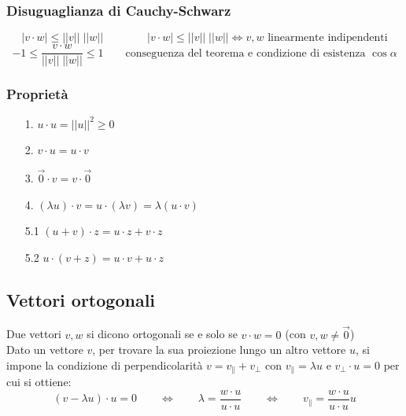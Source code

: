 \documentclass[a4paper]{article}
\begin{document}
\subsubsection*{Disuguaglianza di Cauchy-Schwarz}
\[|v \cdot w| \leq ||v|| \; ||w|| \qquad \qquad |v \cdot w| \leq ||v|| \; ||w|| \Leftrightarrow v, w \text{ linearmente indipendenti}\]
\[-1 \leq \frac{v \cdot w}{||v|| \; ||w||} \leq 1 \qquad \text{conseguenza del teorema e condizione di esistenza } \cos \alpha\]

\subsubsection*{Proprietà}
\begin{enumerate}
	\item[1.] \(u \cdot u = ||u||^2 \geq 0\)
	\item[2.] \(v \cdot u = u \cdot v\)
	\item[3.] \(\vec{0} \cdot v = v \cdot \vec{0}\)
	\item[4.] \((\lambda u) \cdot v = u \cdot (\lambda v) = \lambda (u \cdot v)\)
	\item[5.1] \((u + v) \cdot z = u \cdot z + v \cdot z\)
	\item[5.2] \(u \cdot (v + z) = u \cdot v + u \cdot z\)
\end{enumerate}

\subsection{Vettori ortogonali}
Due vettori \(v,w\) si dicono ortogonali se e solo se \(v \cdot w = 0\) (con \(v, w \neq \vec{0}\)) \\
Dato un vettore \(v\), per trovare la sua proiezione lungo un altro vettore \(u\), si impone la condizione di perpendicolarità
\(v = v_\parallel + v_\perp\) con \(v_\parallel = \lambda u\) e \(v_\perp \cdot u = 0\) per cui si ottiene:
\[(v - \lambda u) \cdot u = 0 \qquad \Leftrightarrow \qquad \lambda = \frac{w \cdot u}{u \cdot u} \qquad \Leftrightarrow \qquad v_\parallel = \frac{w \cdot u}{u \cdot u} u\]

\newpage
\end{document}
